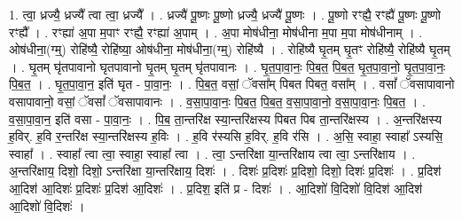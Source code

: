 \documentclass[17pt]{extarticle}
\begin{document}
1. त्वा॒ ध्रज्यै॒ ध्रज्यै᳚ त्वा त्वा॒ ध्रज्यै᳚ । . ध्रज्यै॑ पू॒ष्णः पू॒ष्णो ध्रज्यै॒ ध्रज्यै॑ पू॒ष्णः । . पू॒ष्णो रꣳह्यै॒ रꣳह्यै॑ पू॒ष्णः पू॒ष्णो रꣳह्यै᳚ । . रꣳह्या॑ अ॒पा म॒पाꣳ रꣳह्यै॒ रꣳह्या॑ अ॒पाम् । . अ॒पा मोष॑धीना॒ मोष॑धीना म॒पा म॒पा मोष॑धीनाम् । . ओष॑धीना॒(ग्म्॒) रोहि॑ष्यै॒ रोहि॑ष्या॒ ओष॑धीना॒ मोष॑धीना॒(ग्म्॒) रोहि॑ष्यै । . रोहि॑ष्यै घृ॒तम् घृ॒तꣳ रोहि॑ष्यै॒ रोहि॑ष्यै घृ॒तम् । . घृ॒तम् घृ॑तपावानो घृतपावानो घृ॒तम् घृ॒तम् घृ॑तपावानः । . घृ॒त॒पा॒वा॒नः॒ पि॒ब॒त॒ पि॒ब॒त॒ घृ॒त॒पा॒वा॒नो॒ घृ॒त॒पा॒वा॒नः॒ पि॒ब॒त॒ । . घृ॒त॒पा॒वा॒न॒ इति॑ घृत - पा॒वा॒नः॒ । . पि॒ब॒त॒ वसां॒ ॅवसा᳚म् पिबत पिबत॒ वसा᳚म् । . वसां᳚ ॅवसापावानो वसापावानो॒ वसां॒ ॅवसां᳚ ॅवसापावानः । . व॒सा॒पा॒वा॒नः॒ पि॒ब॒त॒ पि॒ब॒त॒ व॒सा॒पा॒वा॒नो॒ व॒सा॒पा॒वा॒नः॒ पि॒ब॒त॒ । . व॒सा॒पा॒वा॒न॒ इति॑ वसा - पा॒वा॒नः॒ । . पि॒ब॒ ता॒न्तरि॑क्ष स्या॒न्तरि॑क्षस्य पिबत पिब ता॒न्तरि॑क्षस्य । . अ॒न्तरि॑क्षस्य ह॒विर्. ह॒वि र॒न्तरि॑क्ष स्या॒न्तरि॑क्षस्य ह॒विः । . ह॒वि र॑स्यसि ह॒विर्. ह॒वि र॑सि । . अ॒सि॒ स्वाहा॒ स्वाहा᳚ ऽस्यसि॒ स्वाहा᳚ । . स्वाहा᳚ त्वा त्वा॒ स्वाहा॒ स्वाहा᳚ त्वा । . त्वा॒ ऽन्तरि॑क्षा या॒न्तरि॑क्षाय त्वा त्वा॒ ऽन्तरि॑क्षाय । . अ॒न्तरि॑क्षाय॒ दिशो॒ दिशो॒ ऽन्तरि॑क्षा या॒न्तरि॑क्षाय॒ दिशः॑ । . दिशः॑ प्र॒दिशः॑ प्र॒दिशो॒ दिशो॒ दिशः॑ प्र॒दिशः॑ । . प्र॒दिश॑ आ॒दिश॑ आ॒दिशः॑ प्र॒दिशः॑ प्र॒दिश॑ आ॒दिशः॑ । . प्र॒दिश॒ इति॑ प्र - दिशः॑ । . आ॒दिशो॑ वि॒दिशो॑ वि॒दिश॑ आ॒दिश॑ आ॒दिशो॑ वि॒दिशः॑ । \newline
\end{document}

